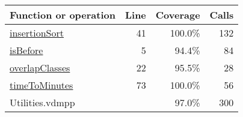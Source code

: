 \bigskip
\begin{longtable}{|l|r|r|r|}
\hline
Function or operation & Line & Coverage & Calls \\
\hline
\hline
\hyperref[insertionSort:41]{insertionSort} & 41&100.0\% & 132 \\
\hline
\hyperref[isBefore:5]{isBefore} & 5&94.4\% & 84 \\
\hline
\hyperref[overlapClasses:22]{overlapClasses} & 22&95.5\% & 28 \\
\hline
\hyperref[timeToMinutes:73]{timeToMinutes} & 73&100.0\% & 56 \\
\hline
\hline
Utilities.vdmpp & & 97.0\% & 300 \\
\hline
\end{longtable}

